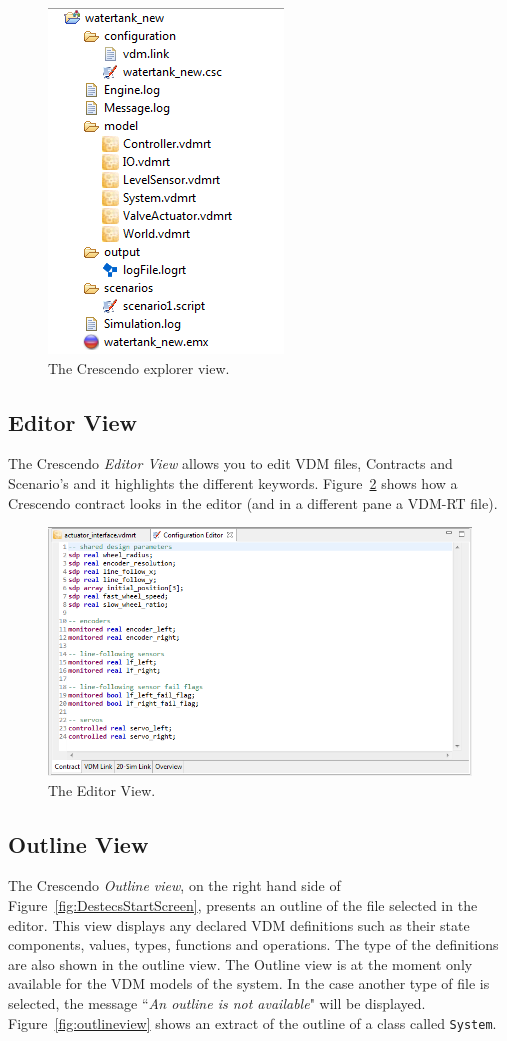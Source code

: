 \documentclass{crescendorepchap}
\begin{document}
\begin{figure}[htbp]
\centering
\includegraphics[width=.3\textwidth]{images/DestecsExplorer.png}
\caption{The Crescendo explorer view.\label{fig:explorerview}}
\end{figure}

\subsection{Editor View}\label{sec:editorview}

The Crescendo \emph{Editor View} allows you to edit VDM files, Contracts and Scenario's and it highlights the different keywords. Figure~\ref{fig:editorcontract1} shows how a Crescendo contract looks in the editor (and in a different pane a VDM-RT file).

\begin{figure}[htbp]
\centering
\includegraphics[width=.6\textwidth]{images/DestecsEditorNewContract.png}
\caption{The Editor View.\label{fig:editorcontract1}}
\end{figure}

\subsection{Outline View}

The Crescendo \emph{Outline view}, on the right hand side of Figure~\ref{fig:DestecsStartScreen}, presents
an outline of the file selected in the editor. This view displays any
declared VDM definitions such as their state components, values, types,
functions and operations. The type of the definitions are also shown in
the outline view. The Outline view is at the moment only available for
the VDM models of the system. In the case another type of file is
selected, the message ``\emph{An outline is not available}" will be displayed. 
Figure~\ref{fig:outlineview} shows an extract of the outline of a class called \texttt{System}. 
\end{document}
